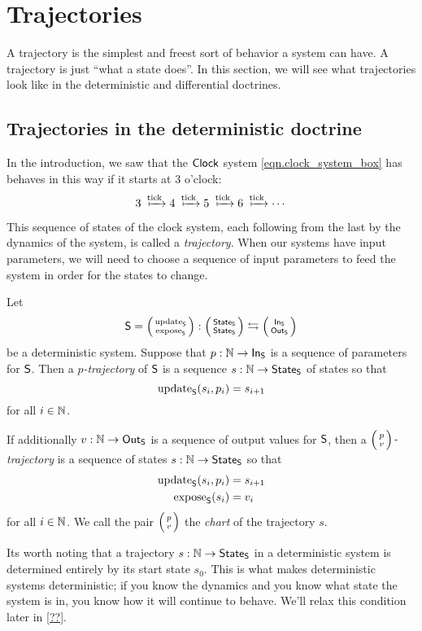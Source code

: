 \documentclass[DynamicalBook]{subfiles}
\begin{document}
\section{Trajectories}

A trajectory is the simplest and freest sort of behavior a system can have. A
trajectory is just ``what a state does''. In this section, we will see what
trajectories look like in the deterministic and differential doctrines.

\subsection{Trajectories in the deterministic doctrine}\label{sec.trajectory_discrete}
In the introduction, we saw that the $\mathsf{Clock}$ system
\cref{eqn.clock_system_box} has behaves in this way if it starts at $3$ o'clock: 
$$3 \xmapsto{\fun{tick}} 4 \xmapsto{\fun{tick}} 5 \xmapsto{\fun{tick}} 6
\xmapsto{\fun{tick}} \cdots$$

This sequence of states of the clock system, each following from the last by the
dynamics of the system, is called a \emph{trajectory}. When our systems have
input parameters, we will need to choose a sequence of input parameters to feed
the system in order for the states to change.

\begin{definition}\label{def.trajectory_discrete}
 Let $$\Sys{S} = \lens{\update{S}}{\expose{S}} : \lens{\State{S}}{\State{S}}
 \leftrightarrows \lens{\In{S}}{\Out{S}}$$
 be a deterministic system. Suppose that $p : \mathbb{N} \to \mathsf{In}_{\mathsf{S}}$ is a sequence of
 parameters for $\mathsf{S}$. Then a \emph{$p$-trajectory} of $\mathsf{S}$ is a sequence $s : \mathbb{N} \to \mathsf{State}_{\mathsf{S}}$ of states so that
 $$\mathrm{update}_{\mathsf{S}}(s_i, p_i) = s_{i + 1}$$
 for all $i \in \mathbb{N}$.

 If additionally $v : \mathbb{N} \to \mathsf{Out}_{\mathsf{S}}$ is a sequence of output values for $\mathsf{S}$, then a
 \emph{$\lens{p}{v}$-trajectory} is a sequence of states $s : \mathbb{N} \to \mathsf{State}_{\mathsf{S}}$ so
 that
 \begin{align*}
   \mathrm{update}_{\mathsf{S}}(s_i, p_i) &= s_{i + 1}\\
   \mathrm{expose}_{\mathsf{S}}(s_i) &= v_i
 \end{align*}
 for all $i \in \mathbb{N}$. We call the pair $\lens{p}{v}$ the \emph{chart} of the trajectory $s$.
\end{definition}

Its worth noting that a trajectory $s : \mathbb{N} \to \mathsf{State}_{\mathsf{S}}$ in a deterministic system is determined
entirely by its start state $s_0$. This is what makes deterministic systems
deterministic; if you know the dynamics and you know what state the system is
in, you know how it will continue to behave. We'll relax this condition later in \cref{??}.
\end{document}
